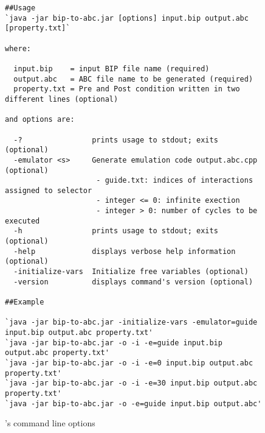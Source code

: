 \begin{figure}[bt]
\centering
\begin{Verbatim}[fontsize=\relsize{-2.0},frame=single]
##Usage
`java -jar bip-to-abc.jar [options] input.bip output.abc [property.txt]`

where:

  input.bip    = input BIP file name (required)
  output.abc   = ABC file name to be generated (required)
  property.txt = Pre and Post condition written in two different lines (optional)

and options are:

  -?                prints usage to stdout; exits (optional)  
  -emulator <s>     Generate emulation code output.abc.cpp (optional)  
                     - guide.txt: indices of interactions assigned to selector 
                     - integer <= 0: infinite exection 
                     - integer > 0: number of cycles to be executed 
  -h                prints usage to stdout; exits (optional) 
  -help             displays verbose help information (optional)
  -initialize-vars  Initialize free variables (optional)
  -version          displays command's version (optional)

##Example

`java -jar bip-to-abc.jar -initialize-vars -emulator=guide input.bip output.abc property.txt'  
`java -jar bip-to-abc.jar -o -i -e=guide input.bip output.abc property.txt'  
`java -jar bip-to-abc.jar -o -i -e=0 input.bip output.abc property.txt'  
`java -jar bip-to-abc.jar -o -i -e=30 input.bip output.abc property.txt'  
`java -jar bip-to-abc.jar -o -e=guide input.bip output.abc'  
\end{Verbatim}
\caption{\biptool's command line options}
\label{fig:implementation:bip}
\end{figure}

